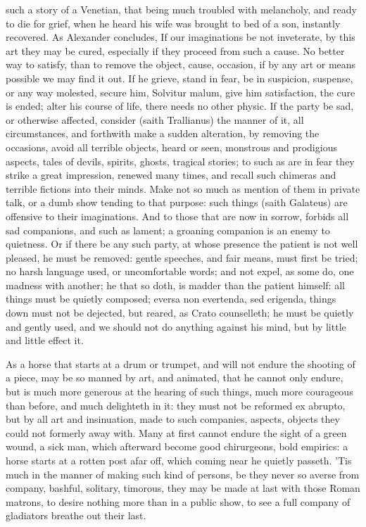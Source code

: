{such a story of a Venetian, that being much troubled with melancholy,
and ready to die for grief, when he heard his wife was brought to
bed of a son, instantly recovered. As Alexander concludes, If our
imaginations be not inveterate, by this art they may be cured,
especially if they proceed from such a cause. No better way to satisfy,
than to remove the object, cause, occasion, if by any art or means
possible we may find it out. If he grieve, stand in fear, be in
suspicion, suspense, or any way molested, secure him, Solvitur malum,
give him satisfaction, the cure is ended; alter his course of life,
there needs no other physic. If the party be sad, or otherwise
affected, consider (saith Trallianus) the manner of it, all
circumstances, and forthwith make a sudden alteration, by removing the
occasions, avoid all terrible objects, heard or seen, monstrous
and prodigious aspects, tales of devils, spirits, ghosts, tragical
stories; to such as are in fear they strike a great impression, renewed
many times, and recall such chimeras and terrible fictions into their
minds. Make not so much as mention of them in private talk, or a
dumb show tending to that purpose: such things (saith Galateus) are
offensive to their imaginations. And to those that are now in sorrow,
\Seneca forbids all sad companions, and such as lament; a groaning
companion is an enemy to quietness. Or if there be any such
party, at whose presence the patient is not well pleased, he must be
removed: gentle speeches, and fair means, must first be tried; no harsh
language used, or uncomfortable words; and not expel, as some do, one
madness with another; he that so doth, is madder than the patient
himself: all things must be quietly composed; eversa non evertenda, sed
erigenda, things down must not be dejected, but reared, as Crato
counselleth;  he must be quietly and gently used, and we should
not do anything against his mind, but by little and little effect it.

As a horse that starts at a drum or trumpet, and will not endure the
shooting of a piece, may be so manned by art, and animated, that he
cannot only endure, but is much more generous at the hearing of such
things, much more courageous than before, and much delighteth in it:
they must not be reformed ex abrupto, but by all art and insinuation,
made to such companies, aspects, objects they could not formerly away
with. Many at first cannot endure the sight of a green wound, a sick
man, which afterward become good chirurgeons, bold empirics: a horse
starts at a rotten post afar off, which coming near he quietly passeth.
'Tis much in the manner of making such kind of persons, be they never
so averse from company, bashful, solitary, timorous, they may be made
at last with those Roman matrons, to desire nothing more than in a
public show, to see a full company of gladiators breathe out their
last.

}
